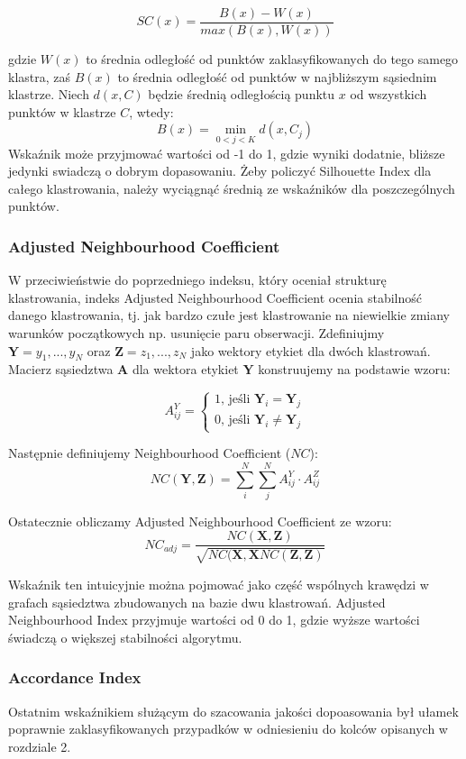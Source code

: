 \documentclass{article}
\begin{document}
\[SC(x) = \frac{B(x) - W(x)}{max(B(x),W(x))}\]

gdzie $W(x)$ to średnia odległość od punktów zaklasyfikowanych do tego samego klastra, zaś $B(x)$ to średnia odległość od punktów w najbliższym sąsiednim klastrze\citep{Rousseeuw1987}.
Niech $d(x, C)$ będzie średnią odległością punktu $x$ od wszystkich punktów w klastrze $C$, wtedy:
\[B(x) = \min_{0 < j < K} d(x, C_j)\]
Wskaźnik może przyjmować wartości od -1 do 1, gdzie wyniki dodatnie, bliższe jedynki swiadczą o dobrym dopasowaniu.
Żeby policzyć Silhouette Index dla całego klastrowania, należy wyciągnąć średnią ze wskaźników dla poszczególnych punktów.

\subsubsection{Adjusted Neighbourhood Coefficient}
W przeciwieństwie do poprzedniego indeksu, który oceniał strukturę klastrowania, indeks Adjusted Neighbourhood Coefficient ocenia stabilność danego klastrowania\citep{Ben-Hur2002}, tj. jak bardzo czułe jest klastrowanie na niewielkie zmiany warunków początkowych np. usunięcie paru obserwacji.
Zdefiniujmy $\textbf{Y} = {y_1, ..., y_N}$ oraz $\textbf{Z} = {z_1, ..., z_N}$ jako wektory etykiet dla dwóch klastrowań. Macierz sąsiedztwa $\textbf{A}$ dla wektora etykiet $\textbf{Y}$ konstruujemy na podstawie wzoru:

$$A^Y_{ij} = \begin{cases}
	1\text{, jeśli} \textbf{ Y}_i = \textbf{Y}_j \\
	0\text{, jeśli}\textbf{ Y}_i \neq \textbf{Y}_j
\end{cases}$$

Następnie definiujemy Neighbourhood Coefficient ($NC$):
$$NC(\textbf{Y}, \textbf{Z}) = \sum_i^N\sum_j^N A^Y_{ij} \cdot A^Z_{ij}$$

Ostatecznie obliczamy Adjusted Neighbourhood Coefficient ze wzoru:
$$NC_{adj} = \frac{NC(\textbf{X},\textbf{Z})}{\sqrt{NC(\textbf{X},\textbf{X}NC(\textbf{Z},\textbf{Z})}}$$

Wskaźnik ten intuicyjnie można pojmować jako część wspólnych krawędzi w grafach sąsiedztwa zbudowanych na bazie dwu klastrowań.
Adjusted Neighbourhood Index przyjmuje wartości od 0 do 1, gdzie wyższe wartości świadczą o większej stabilności algorytmu.
\subsubsection{Accordance Index}
Ostatnim wskaźnikiem służącym do szacowania jakości dopoasowania był ułamek poprawnie zaklasyfikowanych przypadków w odniesieniu do kolców opisanych w rozdziale 2.
\end{document}
